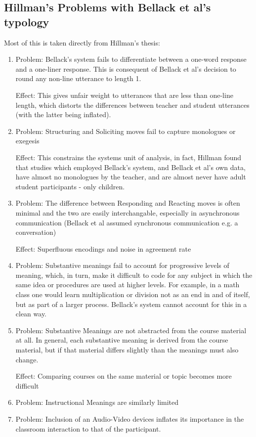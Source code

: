 \documentclass[10pt, letterpaper]{article}
\begin{document}
\subsection*{Hillman's Problems with Bellack et al's typology}
\label{sec:org02ba95f}
Most of this is taken directly from Hillman's thesis:
\begin{enumerate}
\item Problem: Bellack's system fails to differentiate between a one-word
response and a one-liner response. This is consequent of Bellack et al's
decision to round any non-line utterance to length 1.

Effect: This gives unfair weight to utterances that are less than one-line
length, which distorts the differences between teacher and student
utterances (with the latter being inflated).
\item Problem: Structuring and Soliciting moves fail to capture monologues or exegesis

Effect: This constrains the systems unit of analysis, in fact, Hillman
found that studies which employed Bellack's system, and Bellack et al's
own data, have almost no monologues by the teacher, and are almost never
have adult student participants - only children.
\item Problem: The difference between Responding and Reacting moves is often
minimal and the two are easily interchangable, especially in asynchronous
communication (Bellack et al assumed synchronous communication e.g. a
conversation)

Effect: Superfluous encodings and noise in agreement rate
\item Problem: Substantive meanings fail to account for progressive levels of
meaning, which, in turn, make it difficult to code for any subject in
which the same idea or procedures are used at higher levels. For example,
in a math class one would learn multiplication or division not as an end
in and of itself, but as part of a larger process. Bellack's system cannot
account for this in a clean way.
\item Problem: Substantive Meanings are not abstracted from the course material
at all. In general, each substantive meaning is derived from the course
material, but if that material differs slightly than the meanings must
also change.

Effect: Comparing courses on the same material or topic becomes more
difficult
\item Problem: Instructional Meanings are similarly limited
\item Problem: Inclusion of an Audio-Video devices inflates its importance in
the classroom interaction to that of the participant. 


\end{enumerate}
\end{document}
